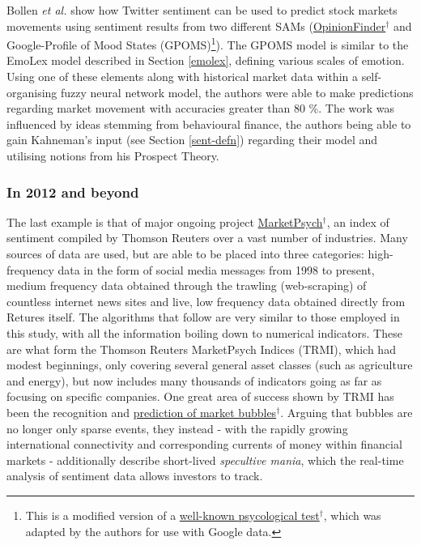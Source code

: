 \documentclass{article}
\begin{document}
Bollen \emph{et al.} \cite{DBLP:journals/corr/abs-1010-3003} show how Twitter sentiment can be used to predict stock markets movements using sentiment results from two different SAMs (\href{http://mpqa.cs.pitt.edu/opinionfinder/}{OpinionFinder$^{\dag{}}$} and Google-Profile of Mood States (GPOMS)\footnote{This is a modified version of a \href{http://www.brianmac.co.uk/poms.htm}{well-known psycological test$^{\dag{}}$}, which was adapted by the authors for use with Google data.}). The GPOMS model is similar to the EmoLex model described in Section \ref{emolex}, defining various scales of emotion. Using one of these elements along with historical market data within a self-organising fuzzy neural network model, the authors were able to make predictions regarding market movement with accuracies greater than 80 \%. The work was influenced by ideas stemming from behavioural finance, the authors being able to gain Kahneman's input (see Section \ref{sent-defn}) regarding their model and utilising notions from his Prospect Theory.


\subsubsection{In 2012 and beyond}
\label{sec-1-5-3}

The last example is that of major ongoing project \href{https://www.marketpsych.com/guide/}{MarketPsych$^{\dag{}}$}, an index of sentiment compiled by Thomson Reuters over a vast number of industries. Many sources of data are used, but are able to be placed into three categories: high-frequency data in the form of social media messages from 1998 to present, medium frequency data obtained through the trawling (web-scraping) of countless internet news sites and live, low frequency data obtained directly from Retures itself. The algorithms that follow are very similar to those employed in this study, with all the information boiling down to numerical indicators. These are what form the Thomson Reuters MarketPsych Indices (TRMI), which had modest beginnings, only covering several general asset classes (such as agriculture and energy), but now includes many thousands of indicators going as far as focusing on specific companies.
One great area of success shown by TRMI has been the recognition and \href{http://thomsonreuters.com/en/articles/2015/understanding-bubbles.html}{prediction of market bubbles$^{\dag{}}$}. Arguing that bubbles are no longer only sparse events, they instead - with the rapidly growing international connectivity and corresponding currents of money within financial markets - additionally describe short-lived \emph{specultive mania}, which the real-time analysis of sentiment data allows investors to track.




\end{document}
